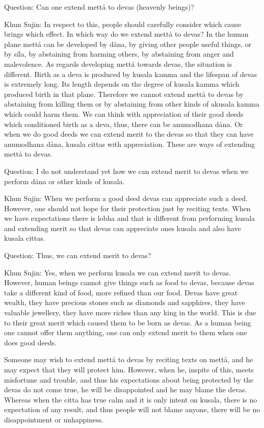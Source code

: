 \documentclass[12pt,twoside]{article}
\begin{document}
Question: Can one extend mett{\aa} to devas (heavenly beings)?

Khun Sujin: In respect to this, people should carefully consider which
cause brings which effect. In which way do we extend mett{\aa} to
devas? In the human plane mett{\aa} can be developed by d{\aa}na, by
giving other people useful things, or by s\'ila, by abstaining from
harming others, by abstaining from anger and malevolence. As regards
developing mett{\aa} towards devas, the situation is different. Birth
as a deva is produced by kusala kamma and the lifespan of devas is
extremely long. Its length depends on the degree of kusala kamma which
produced birth in that plane. Therefore we cannot extend mett{\aa} to
devas by abstaining from killing them or by abstaining from other kinds
of akusala kamma which could harm them. We can think with appreciation
of their good deeds which conditioned birth as a deva, thus, there can
be {\textasciigrave}{\textasciigrave}anumodhana
d{\aa}na{\textquotesingle}{\textquotesingle}. Or when we do good deeds
we can extend merit to the devas so that they can have anumodhana
d{\aa}na, kusala cittas with appreciation. These are ways of extending
mett{\aa} to devas. 

Question: I do not understand yet how we can extend merit to devas when
we perform d{\aa}na or other kinds of kusala. 

Khun Sujin: When we perform a good deed devas can appreciate such a
deed. However, one should not hope for their protection just by
reciting texts. When we have expectations there is lobha and that is
different from performing kusala and extending merit so that devas can
appreciate one{\textquotesingle}s kusala and also have kusala cittas. 

Question: Thus, we can extend merit to devas?

Khun Sujin: Yes, when we perform kusala we can extend merit to devas.
However, human beings cannot give things such as food to devas, because
devas take a different kind of food, more refined than our food. Devas
have great wealth, they have precious stones such as diamonds and
sapphires, they have valuable jewellery, they have more riches than any
king in the world. This is due to their great merit which caused them
to be born as devas. As a human being one cannot offer them anything,
one can only extend merit to them when one does good deeds. 

Someone may wish to extend mett{\aa} to devas by reciting texts on
mett{\aa}, and he may expect that they will protect him. However, when
he, inspite of this, meets misfortune and trouble, and thus his
expectations about being protected by the devas do not come true, he
will be disappointed and he may blame the devas. Whereas when the citta
has true calm and it is only intent on kusala, there is no expectation
of any result, and thus people will not blame anyone, there will be no
disappointment or unhappiness. 
\end{document}
